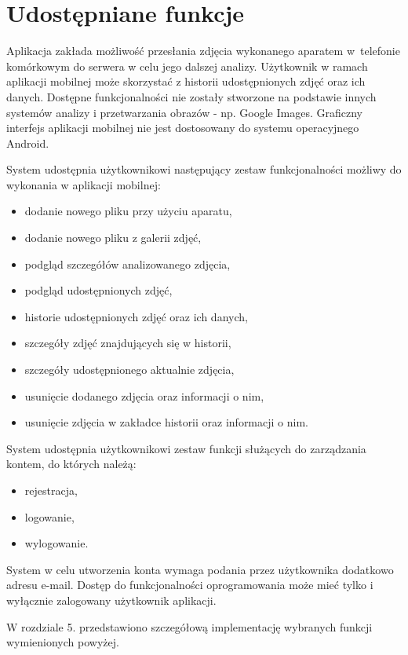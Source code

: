 \section{Udostępniane funkcje}
Aplikacja zakłada możliwość przesłania zdjęcia wykonanego aparatem w~telefonie komórkowym do serwera w celu jego dalszej analizy. Użytkownik w ramach aplikacji mobilnej może skorzystać z historii udostępnionych zdjęć oraz ich danych. Dostępne funkcjonalności nie zostały stworzone na podstawie innych systemów analizy i przetwarzania obrazów - np. Google Images. Graficzny interfejs aplikacji mobilnej nie jest dostosowany do systemu operacyjnego Android.  

System udostępnia użytkownikowi następujący zestaw funkcjonalności możliwy do wykonania w aplikacji mobilnej:
\begin{itemize}[align=left]

	\item dodanie nowego pliku przy użyciu aparatu,
	\item dodanie nowego pliku z galerii zdjęć,
	\item podgląd szczegółów analizowanego zdjęcia,
	\item podgląd udostępnionych zdjęć,
	\item historie udostępnionych zdjęć oraz ich danych,
	\item szczegóły zdjęć znajdujących się w historii,
	\item szczegóły udostępnionego aktualnie zdjęcia,
	\item usunięcie dodanego zdjęcia oraz informacji o nim,
	\item usunięcie zdjęcia w zakładce historii oraz informacji o nim.
	
\end{itemize}

System udostępnia użytkownikowi zestaw funkcji służących do zarządzania kontem, do których należą:
\begin{itemize}[align=left]
	\item rejestracja,
	\item logowanie,	
	\item wylogowanie.
\end{itemize}

System w celu utworzenia konta wymaga podania przez użytkownika dodatkowo adresu e-mail. Dostęp do funkcjonalności oprogramowania może mieć tylko i wyłącznie zalogowany użytkownik aplikacji. 

W rozdziale 5. przedstawiono szczegółową implementację wybranych funkcji wymienionych powyżej.